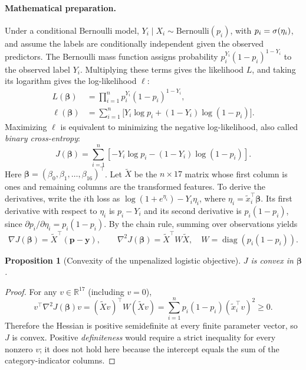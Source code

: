 \documentclass[11pt,a4paper]{article}
\newtheorem{proposition}{Proposition}[section]\newtheorem{remark}{Remark}[section]
\begin{document}
\paragraph{Mathematical preparation.} Under a conditional Bernoulli model, $Y_i\mid X_i\sim\mathrm{Bernoulli}(p_i)$, with $p_i=\sigma(\eta_i)$, and assume the labels are conditionally independent given the observed predictors. The Bernoulli mass function assigns probability $p_i^{Y_i}(1-p_i)^{1-Y_i}$ to the observed label $Y_i$. Multiplying these terms gives the likelihood $L$, and taking its logarithm gives the log-likelihood $\ell$:
\begin{align}
L(\bm\beta)&=\prod_{i=1}^{n}p_i^{Y_i}(1-p_i)^{1-Y_i},\\
\ell(\bm\beta)&=\sum_{i=1}^{n}\bigl[Y_i\log p_i+(1-Y_i)\log(1-p_i)\bigr].
\end{align}
Maximizing $\ell$ is equivalent to minimizing the negative log-likelihood, also called \emph{binary cross-entropy}:
\begin{equation}\label{eq:loss}J(\bm\beta)=\sum_{i=1}^n\left[-Y_i\log p_i-(1-Y_i)\log(1-p_i)\right].\end{equation}
Here $\bm\beta=(\beta_0,\beta_1,\ldots,\beta_{16})^\top$. Let $\tilde X$ be the $n\times17$ matrix whose first column is ones and remaining columns are the transformed features. To derive the derivatives, write the $i$th loss as
$\log(1+e^{\eta_i})-Y_i\eta_i$, where
$\eta_i=\tilde x_i^\top\bm\beta$.
Its first derivative with respect to $\eta_i$ is $p_i-Y_i$ and its
second derivative is $p_i(1-p_i)$, since
$\partial p_i/\partial\eta_i=p_i(1-p_i)$. By the chain rule, summing over observations yields
\begin{equation}\label{eq:gradient}\nabla J(\bm\beta)=\tilde X^\top(\bm p-\bm y),\qquad \nabla^2J(\bm\beta)=\tilde X^\top W\tilde X,\quad W=\operatorname{diag}(p_i(1-p_i)).\end{equation}
\begin{proposition}[Convexity of the unpenalized logistic objective]$J$ is convex in $\bm\beta$.\end{proposition}
\begin{proof}
For any $v\in\mathbb R^{17}$ (including $v=0$),
\[
v^\top\nabla^2J(\bm\beta)v
=(\tilde Xv)^\top W(\tilde Xv)
=\sum_{i=1}^{n}p_i(1-p_i)(\tilde x_i^\top v)^2\ge0.
\]
Therefore the Hessian is positive semidefinite at every finite parameter
vector, so $J$ is convex. Positive \emph{definiteness} would require a
strict inequality for every nonzero $v$; it does not hold here because
the intercept equals the sum of the category-indicator columns.
\end{proof}
\end{document}
